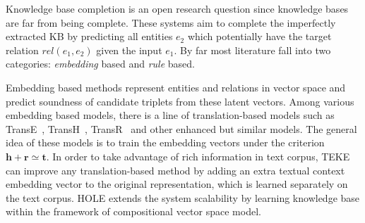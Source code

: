 Knowledge base completion is an open research question
since knowledge bases are far from being complete.
These systems aim to complete the imperfectly extracted KB by
predicting all entities $e_2$
which potentially have the target relation $rel(e_1, e_2)$ given the input $e_1$.
By far most literature fall into two categories: {\em embedding} based and {\em rule} based.


Embedding based methods represent entities and relations in vector space and predict
soundness of candidate triplets from these latent vectors.
Among various embedding based models, there is a line of translation-based models such as
TransE~\cite{bordes2013translating}, TransH~\cite{wang2014knowledge},
TransR~\cite{lin2015learning} and other enhanced but similar models. The general idea of these models is to train the embedding vectors under the criterion $\textbf{h} + \textbf{r} \simeq \textbf{t}$.
In order to take advantage of rich information in text corpus, TEKE \cite{wang2016text} can improve any translation-based method by adding an extra textual context embedding vector to the original representation, which is learned separately on the text corpus.
HOLE \cite{nickel2015holographic} extends the system scalability by learning knowledge base within the framework of compositional vector space model.

